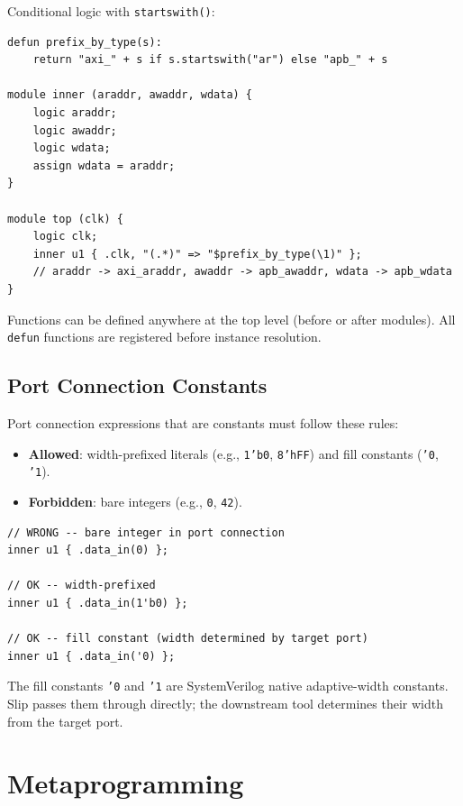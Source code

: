 \documentclass[lang=en,11pt]{elegantbook}
\newcommand{\code}[1]{\texttt{#1}}
\begin{document}
Conditional logic with \code{startswith()}:
\begin{lstlisting}[language=Slip]
defun prefix_by_type(s):
    return "axi_" + s if s.startswith("ar") else "apb_" + s

module inner (araddr, awaddr, wdata) {
    logic araddr;
    logic awaddr;
    logic wdata;
    assign wdata = araddr;
}

module top (clk) {
    logic clk;
    inner u1 { .clk, "(.*)" => "$prefix_by_type(\1)" };
    // araddr -> axi_araddr, awaddr -> apb_awaddr, wdata -> apb_wdata
}
\end{lstlisting}

Functions can be defined anywhere at the top level (before or after modules). All \code{defun} functions are registered before instance resolution.

\section{Port Connection Constants}

Port connection expressions that are constants must follow these rules:

\begin{itemize}
  \item \textbf{Allowed}: width-prefixed literals (e.g., \code{1'b0}, \code{8'hFF}) and fill constants (\code{'0}, \code{'1}).
  \item \textbf{Forbidden}: bare integers (e.g., \code{0}, \code{42}).
\end{itemize}

\begin{lstlisting}[language=Slip]
// WRONG -- bare integer in port connection
inner u1 { .data_in(0) };

// OK -- width-prefixed
inner u1 { .data_in(1'b0) };

// OK -- fill constant (width determined by target port)
inner u1 { .data_in('0) };
\end{lstlisting}

The fill constants \code{'0} and \code{'1} are SystemVerilog native adaptive-width constants. Slip passes them through directly; the downstream tool determines their width from the target port.

\chapter{Metaprogramming}
\end{document}
